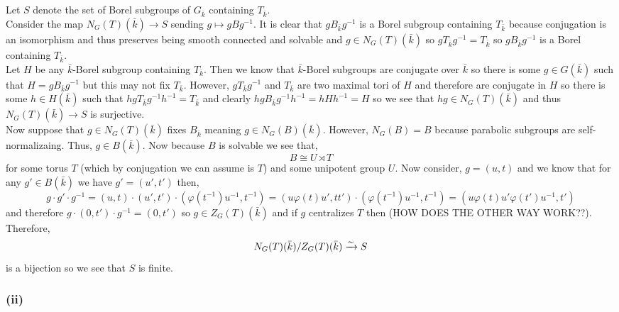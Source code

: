 \documentclass[12pt]{article}
\begin{document}
Let $S$ denote the set of Borel subgroups of $G_{\bar{k}}$ containing $T_{\bar{k}}$.
\bigskip\\
Consider the map $N_G(T)(\bar{k}) \to S$ sending $g \mapsto g B g^{-1}$. It is clear that $g B_{\bar{k}} g^{-1}$ is a Borel subgroup containing $T_{\bar{k}}$ because conjugation is an isomorphism and thus preserves being smooth connected and solvable and $g \in N_G(T)(\bar{k})$ so $g T_{\bar{k}} g^{-1} = T_{\bar{k}}$ so $g B_{\bar{k}} g^{-1}$ is a Borel containing $T_{\bar{k}}$.
\bigskip\\
Let $H$ be any $\bar{k}$-Borel subgroup containing $T_{\bar{k}}$. Then we know that $\bar{k}$-Borel subgroups are conjugate over $\bar{k}$ so there is some $g \in G(\bar{k})$ such that $H = g B_{\bar{k}} g^{-1}$ but this may not fix $T_{\bar{k}}$. However, $g T_{\bar{k}} g^{-1}$ and $T_{\bar{k}}$ are two maximal tori of $H$ and therefore are conjugate in $H$ so there is some $h \in H(\bar{k})$ such that $h g T_{\bar{k}} g^{-1} h^{-1} = T_{\bar{k}}$ and clearly $h g B_{\bar{k}} g^{-1} h^{-1} = h H h^{-1} = H$ so we see that $hg \in N_G(T)(\bar{k})$ and thus $N_G(T)(\bar{k}) \to S$ is surjective. 
\bigskip\\
Now suppose that $g \in N_G(T)(\bar{k})$ fixes $B_{\bar{k}}$ meaning $g \in N_G(B)(\bar{k})$. However, $N_G(B) = B$ because parabolic subgroups are self-normalizaing. Thus, $g \in B(\bar{k})$. Now because $B$ is solvable we see that,
\[ B \cong U \rtimes T \]
for some torus $T$ (which by conjugation we can assume is $T$) and some unipotent group $U$. Now consider, $g = (u,t)$ and we know that for any $g' \in B(\bar{k})$ we have $g' = (u',t')$ then,
\[ g \cdot g' \cdot g^{-1} = (u,t) \cdot (u',t') \cdot (\varphi(t^{-1}) u^{-1}, t^{-1}) = (u \varphi(t) u', tt') \cdot (\varphi(t^{-1}) u^{-1}, t^{-1}) = (u \varphi(t) u' \varphi(t') u^{-1}, t') \]
and therefore $g \cdot (0, t') \cdot g^{-1} = (0, t')$ so $g \in Z_G(T)(\bar{k})$ and if $g$ centralizes $T$ then (HOW DOES THE OTHER WAY WORK??). Therefore,
\[ N_G(T)(\bar{k}) / Z_G(T)(\bar{k}) \xrightarrow{\sim} S \]
is a bijection so we see that $S$ is finite.

\subsubsection{(ii)}
\end{document}
